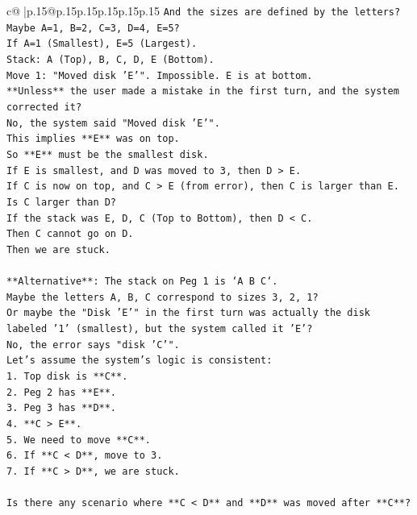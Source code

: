 \documentclass{article}
\begin{document}
{\begin{supertabular}{c@{$\;$}|p{.15\linewidth}@{}p{.15\linewidth}p{.15\linewidth}p{.15\linewidth}p{.15\linewidth}p{.15\linewidth}}
{{{\texttt{And the sizes are defined by the letters?} \\
\texttt{Maybe A=1, B=2, C=3, D=4, E=5?} \\
\texttt{If A=1 (Smallest), E=5 (Largest).} \\
\texttt{Stack: A (Top), B, C, D, E (Bottom).} \\
\texttt{Move 1: "Moved disk 'E'". Impossible. E is at bottom.} \\
\texttt{**Unless** the user made a mistake in the first turn, and the system corrected it?} \\
\texttt{No, the system said "Moved disk 'E'".} \\
\texttt{This implies **E** was on top.} \\
\texttt{So **E** must be the smallest disk.} \\
\texttt{If E is smallest, and D was moved to 3, then D > E.} \\
\texttt{If C is now on top, and C > E (from error), then C is larger than E.} \\
\texttt{Is C larger than D?} \\
\texttt{If the stack was E, D, C (Top to Bottom), then D < C.} \\
\texttt{Then C cannot go on D.} \\
\texttt{Then we are stuck.} \\
\\ 
\texttt{**Alternative**: The stack on Peg 1 is `A B C`.} \\
\texttt{Maybe the letters A, B, C correspond to sizes 3, 2, 1?} \\
\texttt{Or maybe the "Disk 'E'" in the first turn was actually the disk labeled '1' (smallest), but the system called it 'E'?} \\
\texttt{No, the error says "disk 'C'".} \\
\texttt{Let's assume the system's logic is consistent:} \\
\texttt{1.  Top disk is **C**.} \\
\texttt{2.  Peg 2 has **E**.} \\
\texttt{3.  Peg 3 has **D**.} \\
\texttt{4.  **C > E**.} \\
\texttt{5.  We need to move **C**.} \\
\texttt{6.  If **C < D**, move to 3.} \\
\texttt{7.  If **C > D**, we are stuck.} \\
\\ 
\texttt{Is there any scenario where **C < D** and **D** was moved after **C**?} \\
}}}
\end{supertabular}}
\end{document}
